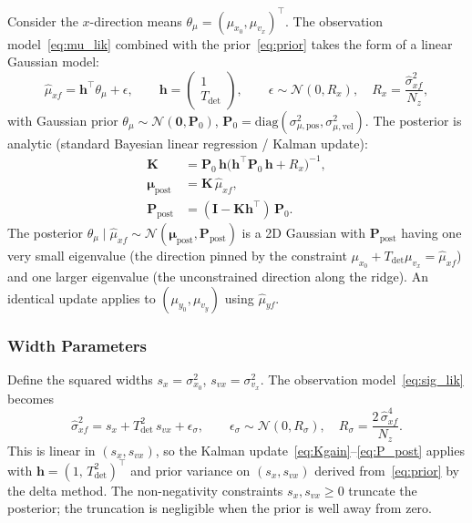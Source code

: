 \documentclass[11pt,a4paper]{article}
\begin{document}
Consider the $x$-direction means $\theta_\mu = (\mu_{x_0}, \mu_{v_x})^\top$.
The observation model~\eqref{eq:mu_lik} combined with the
prior~\eqref{eq:prior} takes the form of a linear Gaussian model:
\begin{equation}
  \hat\mu_{xf} = \mathbf{h}^\top \theta_\mu + \epsilon,\qquad
  \mathbf{h} = \begin{pmatrix}1 \\ T_\mathrm{det}\end{pmatrix},\qquad
  \epsilon \sim \mathcal{N}(0, R_x),\quad
  R_x = \frac{\hat\sigma^2_{xf}}{N_z},
  \label{eq:linmod}
\end{equation}
with Gaussian prior $\theta_\mu \sim \mathcal{N}(\mathbf{0}, \mathbf{P}_0)$,
$\mathbf{P}_0 = \mathrm{diag}(\sigma^2_{\mu,\mathrm{pos}},\sigma^2_{\mu,\mathrm{vel}})$.
The posterior is analytic (standard Bayesian linear regression / Kalman update):
\begin{align}
  \mathbf{K}    &= \mathbf{P}_0\,\mathbf{h}
                   \bigl(\mathbf{h}^\top\mathbf{P}_0\,\mathbf{h} + R_x\bigr)^{-1},
  \label{eq:Kgain}\\
  \boldsymbol{\mu}_\mathrm{post} &= \mathbf{K}\,\hat\mu_{xf},
  \label{eq:mu_post}\\
  \mathbf{P}_\mathrm{post} &= (\mathbf{I} - \mathbf{K}\mathbf{h}^\top)\,\mathbf{P}_0.
  \label{eq:P_post}
\end{align}
The posterior $\theta_\mu \mid \hat\mu_{xf} \sim \mathcal{N}(\boldsymbol{\mu}_\mathrm{post},
\mathbf{P}_\mathrm{post})$ is a 2D Gaussian with $\mathbf{P}_\mathrm{post}$ having
one very small eigenvalue (the direction pinned by the constraint
$\mu_{x_0}+T_\mathrm{det}\mu_{v_x}=\hat\mu_{xf}$) and one larger eigenvalue
(the unconstrained direction along the ridge).
An identical update applies to $(\mu_{y_0}, \mu_{v_y})$ using $\hat\mu_{yf}$.

\subsubsection{Width Parameters}

Define the squared widths $s_x = \sigma^2_{x_0}$, $s_{vx} = \sigma^2_{v_x}$.
The observation model~\eqref{eq:sig_lik} becomes
\begin{equation}
  \hat\sigma^2_{xf} = s_x + T_\mathrm{det}^2\,s_{vx} + \epsilon_\sigma,\qquad
  \epsilon_\sigma \sim \mathcal{N}(0, R_\sigma),\quad
  R_\sigma = \frac{2\,\hat\sigma^4_{xf}}{N_z}.
  \label{eq:linmod_sig}
\end{equation}
This is linear in $(s_x, s_{vx})$, so the Kalman update~\eqref{eq:Kgain}--\eqref{eq:P_post}
applies with $\mathbf{h} = (1,\, T_\mathrm{det}^2)^\top$ and prior variance
on $(s_x, s_{vx})$ derived from~\eqref{eq:prior} by the delta method.
The non-negativity constraints $s_x, s_{vx} \ge 0$ truncate the posterior;
the truncation is negligible when the prior is well away from zero.
\end{document}
